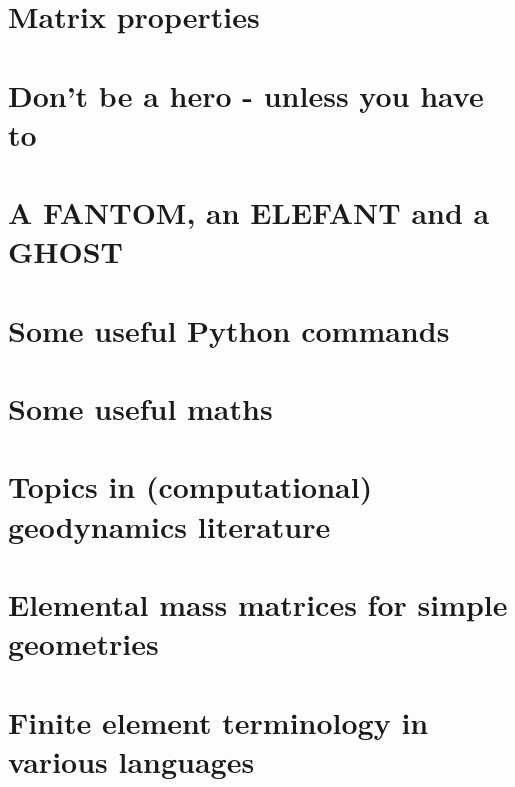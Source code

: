 \documentclass[a4paper]{article}
\begin{document}
\section{Matrix properties}  %
\newpage %
\section{Don’t be a hero - unless you have to}  %
\newpage %
\section{A FANTOM, an ELEFANT and a GHOST}  %
\newpage %
\section{Some useful Python commands}  %
\newpage %
\section{Some useful maths}  \label{app_maths} %
\newpage %
\section{Topics in (computational) geodynamics literature}\label{app:topics}
\newpage %
\section{Elemental mass matrices for simple geometries}\label{app:mm} 
\newpage %
\section{Finite element terminology in various languages}  %
\newpage %
\end{document}
